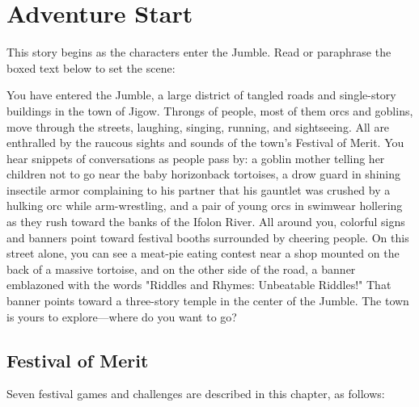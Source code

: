 \documentclass[10pt,a4paper,twoside,bg=print,twocolumn,openany,nodeprecatedcode]{dndbook}
\begin{document}
\section{Adventure Start}
This story begins as the characters enter the Jumble. Read or paraphrase the boxed text below to set the scene:
\begin{DndReadAloud}{}
You have entered the Jumble, a large district of tangled roads and single-story buildings in the town of Jigow. Throngs of people, most of them orcs and goblins, move through the streets, laughing, singing, running, and sightseeing. All are enthralled by the raucous sights and sounds of the town's Festival of Merit.
You hear snippets of conversations as people pass by: a goblin mother telling her children not to go near the baby horizonback tortoises, a drow guard in shining insectile armor complaining to his partner that his gauntlet was crushed by a hulking orc while arm-wrestling, and a pair of young orcs in swimwear hollering as they rush toward the banks of the Ifolon River.
All around you, colorful signs and banners point toward festival booths surrounded by cheering people. On this street alone, you can see a meat-pie eating contest near a shop mounted on the back of a massive tortoise, and on the other side of the road, a banner emblazoned with the words "Riddles and Rhymes: Unbeatable Riddles!" That banner points toward a three-story temple in the center of the Jumble. The town is yours to explore—where do you want to go?
\end{DndReadAloud}

\subsection{Festival of Merit}
Seven festival games and challenges are described in this chapter, as follows:
\end{document}
